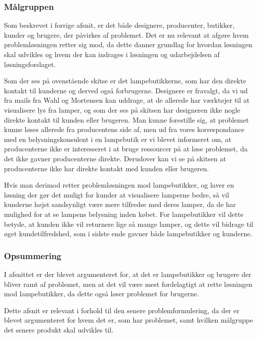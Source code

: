 \subsubsection{Målgruppen}
Som beskrevet i forrige afsnit, er det både designere, producenter, butikker, kunder og brugere, der påvirkes af problemet. Det er nu relevant at afgøre hvem problemløsningen retter sig mod, da dette danner grundlag for hvordan løsningen skal udvikles og hvem der kan indrages i løsningen og udarbejdelsen af løsningsforslaget.

Som der ses på ovenstående skitse er det lampebutikkerne, som har den direkte kontakt til kunderne og derved også forbrugerne. Designere er fravalgt, da vi ud fra mails fra Wahl og Mortensen kan uddrage, at de allerede har værktøjer til at visualisere lys fra lamper, og som der ses på skitsen har designeren ikke nogle direkte kontakt til kunden eller brugeren. Man kunne forestille sig, at problemet kunne løses allerede fra producentens side af, men ud fra vores korrespondance med en belysningskonsulent i en lampebutik er vi blevet informeret om, at producenterne ikke er interesseret i at bruge ressourcer på at løse problemet, da det ikke gavner producenterne direkte. Derudover kan vi se på skitsen at producenterne ikke har direkte kontakt med kunden eller brugeren.

Hvis man derimod retter problemløsningen mod lampebutikker, og laver en løsning der gør det muligt for kunder at visualisere lamperne bedre, så vil kunderne højst sandsynligt være mere tilfredse med deres lamper, da de har mulighed for at se lampens belysning inden købet. For lampebutikker vil dette betyde, at kunden ikke vil returnere lige så mange lamper, og dette vil bidrage til øget kundetilfredshed, som i sidste ende gavner både lampebutikker og kunderne.

\subsubsection*{Opsummering}
I afsnittet er der blevet argumenteret for, at det er lampebutikker og brugere der bliver ramt af problemet, men at det vil være mest fordelagtigt at rette løsningen mod lampebutikker, da dette også løser problemet for brugerne.

Dette afsnit er relevant i forhold til den senere problemformulering, da der er blevet argumenteret for hvem det er, som har problemet, samt hvilken målgruppe det senere produkt skal udvikles til.
